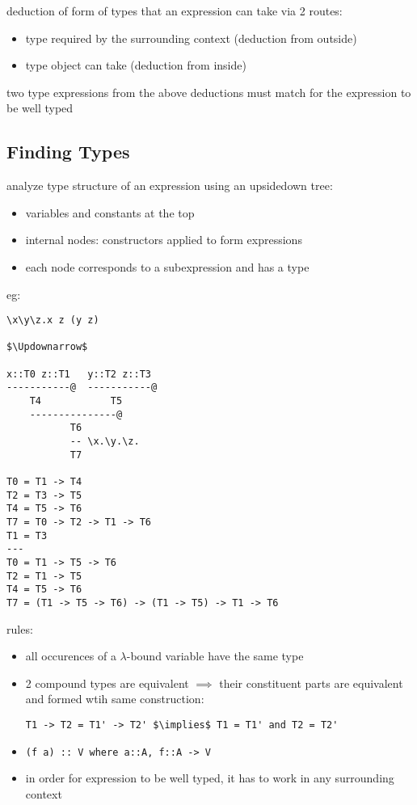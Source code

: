 \documentclass[8pt]{extarticle}
\begin{document}
\begin{multicols*}{2}

deduction of form of types that an expression can take via 2 routes:
\begin{itemize}
\item type required by the surrounding context (deduction from outside)
\item type object can take (deduction from inside)
\end{itemize}
two type expressions from the above deductions must match for the expression to be well typed

\vfill\null
\columnbreak

\subsection{Finding Types}

analyze type structure of an expression using an upsidedown tree:
\begin{itemize}
\item variables and constants at the top
\item internal nodes: constructors applied to form expressions
\item each node corresponds to a subexpression and has a type
\end{itemize}

eg:
\begin{lstlisting}
\x\y\z.x z (y z)

$\Updownarrow$

x::T0 z::T1   y::T2 z::T3
-----------@  -----------@
    T4            T5
    ---------------@
           T6
           -- \x.\y.\z.
           T7

T0 = T1 -> T4
T2 = T3 -> T5
T4 = T5 -> T6
T7 = T0 -> T2 -> T1 -> T6
T1 = T3
---
T0 = T1 -> T5 -> T6
T2 = T1 -> T5
T4 = T5 -> T6
T7 = (T1 -> T5 -> T6) -> (T1 -> T5) -> T1 -> T6
\end{lstlisting}
         
rules:
\begin{itemize}
\item all occurences of a $\lambda$-bound variable have the same type
\item 2 compound types are equivalent $\implies$ their constituent parts are equivalent and formed wtih same construction:
\begin{lstlisting}
T1 -> T2 = T1' -> T2' $\implies$ T1 = T1' and T2 = T2'
\end{lstlisting}
\item \verb|(f a) :: V where a::A, f::A -> V|
\item in order for expression to be well typed, it has to work in any surrounding context
\end{itemize}


\end{multicols*}
\end{document}
